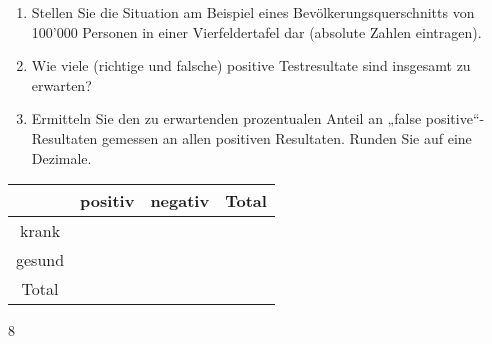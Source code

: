 {{\begin{enumerate}[label=\alph*)]
\item
Stellen Sie die Situation am Beispiel eines Bevölkerungsquerschnitts von 100’000 Personen in einer Vierfeldertafel dar (absolute Zahlen eintragen).
\item
Wie viele (richtige und falsche) positive Testresultate sind insgesamt zu erwarten?
\item
Ermitteln Sie den zu erwartenden prozentualen Anteil an „false positive“-Resultaten
gemessen an allen positiven Resultaten. Runden Sie auf eine Dezimale.
\end{enumerate}

\renewcommand{\arraystretch}{2}
\begin{tabular}{|c|c|c|c|}\hline
         & positiv & negativ & Total\\\hline
krank    &          &         &      \\\hline
gesund   &         &         &      \\\hline
Total    &         &         &      \\\hline
 \end{tabular}
\renewcommand{\arraystretch}{1}
 
}{%
}{8}

}
